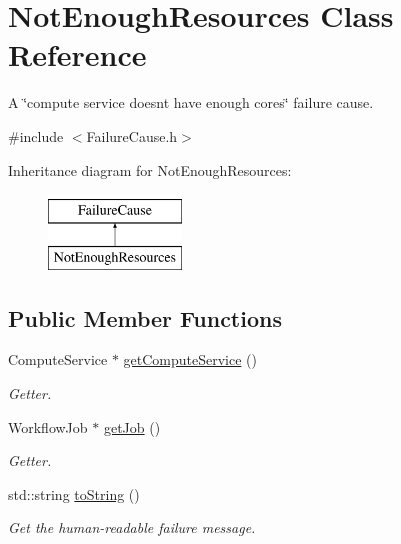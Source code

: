\hypertarget{class_not_enough_resources}{}\section{Not\+Enough\+Resources Class Reference}
\label{class_not_enough_resources}


A \char`\"{}compute service doesn\textquotesingle{}t have enough cores\char`\"{} failure cause.  




{\ttfamily \#include $<$Failure\+Cause.\+h$>$}

Inheritance diagram for Not\+Enough\+Resources\+:\begin{figure}[H]
\begin{center}
\leavevmode
\includegraphics[height=2.000000cm]{class_not_enough_resources}
\end{center}
\end{figure}
\subsection*{Public Member Functions}
\begin{DoxyCompactItemize}
\item 
Compute\+Service $\ast$ \hyperlink{class_not_enough_resources_a6f2a60114e79fa4cb3cb74a920b8acb1}{get\+Compute\+Service} ()
\begin{DoxyCompactList}\small\item\em Getter. \end{DoxyCompactList}\item 
Workflow\+Job $\ast$ \hyperlink{class_not_enough_resources_aa3458ab69841bc19d08cdc9b8e4f4c70}{get\+Job} ()
\begin{DoxyCompactList}\small\item\em Getter. \end{DoxyCompactList}\item 
std\+::string \hyperlink{class_not_enough_resources_ac892a122133e7b24af8ccf7fbd951eef}{to\+String} ()
\begin{DoxyCompactList}\small\item\em Get the human-\/readable failure message. \end{DoxyCompactList}\end{DoxyCompactItemize}


